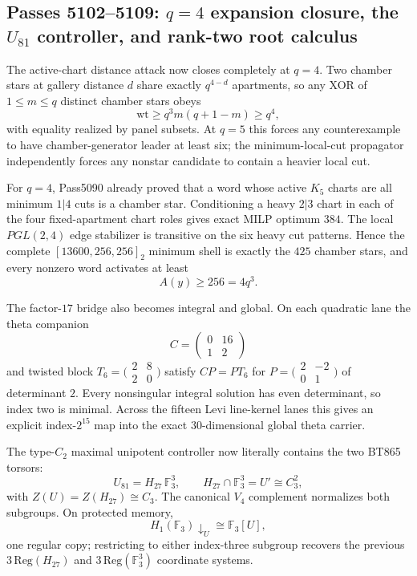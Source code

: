 \ifdefined\WPassFiveOneZeroTwoLoaded\else
\gdef\WPassFiveOneZeroTwoLoaded{1}
\subsection*{Passes 5102--5109: $q=4$ expansion closure, the $U_{81}$ controller, and rank-two root calculus}
The active-chart distance attack now closes completely at $q=4$.  Two chamber stars at gallery distance $d$ share exactly $q^{4-d}$ apartments, so any XOR of $1\le m\le q$ distinct chamber stars obeys
\[
 \mathrm{wt}\ge q^3m(q+1-m)\ge q^4,
\]
with equality realized by panel subsets.  At $q=5$ this forces any counterexample to have chamber-generator leader at least six; the minimum-local-cut propagator independently forces any nonstar candidate to contain a heavier local cut.

For $q=4$, Pass5090 already proved that a word whose active $K_5$ charts are all minimum $1|4$ cuts is a chamber star.  Conditioning a heavy $2|3$ chart in each of the four fixed-apartment chart roles gives exact MILP optimum $384$.  The local $PGL(2,4)$ edge stabilizer is transitive on the six heavy cut patterns.  Hence the complete $[13600,256,256]_2$ minimum shell is exactly the $425$ chamber stars, and every nonzero word activates at least
\[
 A(y)\ge256=4q^3.
\]

The factor-$17$ bridge also becomes integral and global.  On each quadratic lane the theta companion
\[
 C=\begin{pmatrix}0&16\\1&2\end{pmatrix}
\]
and twisted block $T_6=\bigl(\begin{smallmatrix}2&8\\2&0\end{smallmatrix}\bigr)$ satisfy $CP=PT_6$ for $P=\bigl(\begin{smallmatrix}2&-2\\0&1\end{smallmatrix}\bigr)$ of determinant $2$.  Every nonsingular integral solution has even determinant, so index two is minimal.  Across the fifteen Levi line-kernel lanes this gives an explicit index-$2^{15}$ map into the exact $30$-dimensional global theta carrier.

The type-$C_2$ maximal unipotent controller now literally contains the two BT865 torsors:
\[
 U_{81}=H_{27}\,\mathbb F_3^3,\qquad
 H_{27}\cap\mathbb F_3^3=U'\cong C_3^2,
\]
with $Z(U)=Z(H_{27})\cong C_3$.  The canonical $V_4$ complement normalizes both subgroups.  On protected memory,
\[
 H_1(\mathbb F_3)\!\downarrow_U\cong\mathbb F_3[U],
\]
one regular copy; restricting to either index-three subgroup recovers the previous $3\,\mathrm{Reg}(H_{27})$ and $3\,\mathrm{Reg}(\mathbb F_3^3)$ coordinate systems.

